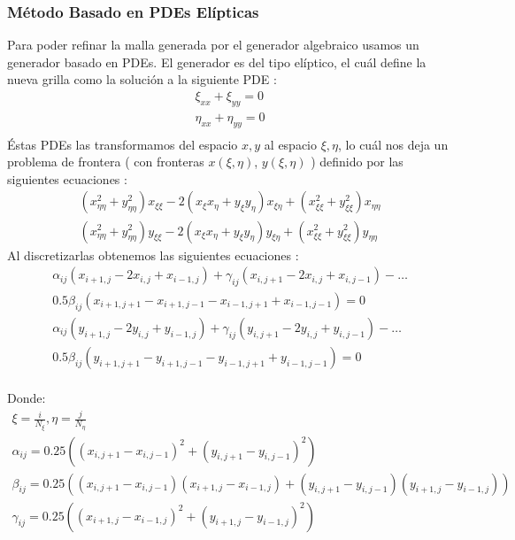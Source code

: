 \documentclass[11pt,letterpaper]{article}
\begin{document}
\subsubsection{Método Basado en PDEs Elípticas}
Para poder refinar la malla generada por el generador algebraico usamos un generador basado en PDEs. El generador es del tipo el\'iptico, el cu\'al define la nueva grilla como la soluci\'on a la siguiente PDE :
		\begin{gather*}
			\xi_{xx} + \xi_{yy} = 0 \\
			\eta_{xx} + \eta_{yy} = 0 \\
		\end{gather*}
		\'Estas PDEs las transformamos del espacio $x,y$ al espacio $\xi, \eta$, lo cu\'al nos deja un problema de frontera ( con fronteras $x(\xi,\eta)$, $y(\xi,\eta)$ ) definido por las siguientes ecuaciones :
		\begin{gather*}
			( x_{\eta \eta}^{2} + y_{\eta \eta}^{2} )x_{\xi \xi} 
				- 2 ( x_{\xi} x_{\eta} + y_{\xi} y_{\eta} ) x_{\xi \eta}
				+ ( x_{\xi \xi}^{2} + y_{\xi \xi}^{2} )x_{\eta \eta} 
			\\
			( x_{\eta \eta}^{2} + y_{\eta \eta}^{2} )y_{\xi \xi} 
				- 2 ( x_{\xi} x_{\eta} + y_{\xi} y_{\eta} ) y_{\xi \eta}
				+ ( x_{\xi \xi}^{2} + y_{\xi \xi}^{2} )y_{\eta \eta} 
		\end{gather*}
		Al discretizarlas obtenemos las siguientes ecuaciones :
		\begin{gather*}
			\alpha_{ij} ( x_{i+1,j} - 2 x_{i,j} + x_{i-1,j} ) + \gamma_{ij} ( x_{i, j + 1} - 2 x_{i, j} + x_{i,j-1} ) - \hdots \\
				 0.5 \beta_{ij} ( x_{i+1,j+1} - x_{i+1,j-1} - x_{i-1,j+1} + x_{i-1,j-1} ) = 0
			\\
			\alpha_{ij} ( y_{i+1,j} - 2 y_{i,j} + y_{i-1,j} ) + \gamma_{ij} ( y_{i, j + 1} - 2 y_{i, j} + y_{i,j-1} ) - \hdots \\
				 0.5 \beta_{ij} ( y_{i+1,j+1} - y_{i+1,j-1} - y_{i-1,j+1} + y_{i-1,j-1} ) = 0
		\end{gather*}
		\\
		Donde:
		\begin{gather*}
			 \xi = \frac{i}{N_{\xi}},\eta = \frac{j}{N_{\eta}}
			 \\
			 \alpha_{ij} = 0.25 ( ( x_{i,j+1} - x_{i,j-1} )^{2} + (y_{i,j+1} - y_{i,j-1})^{2} )
			 \\
			 \beta_{ij} = 0.25 ( ( x_{i,j+1} - x_{i,j-1} ) ( x_{i+1,j} - x_{i-1,j} ) + ( y_{i,j+1} - y_{i,j-1} ) ( y_{i+1,j} - y_{i-1,j} ) )
			 \\
			 \gamma_{ij} = 0.25 ( ( x_{i+1,j} - x_{i-1,j} )^{2} + (y_{i+1,j} - y_{i-1,j})^{2} )
		\end{gather*}
\end{document}
